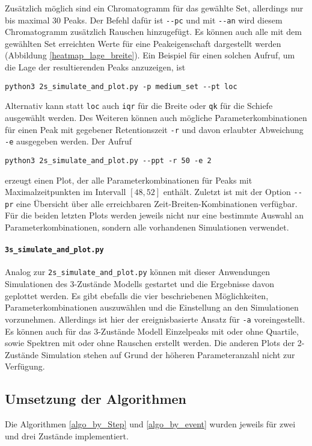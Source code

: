 Zusätzlich möglich sind ein Chromatogramm für das gewählte Set, allerdings nur bis maximal 30 Peaks. Der Befehl dafür ist \verb!--pc! und mit \verb!--an! wird diesem Chromatogramm zusätzlich Rauschen hinzugefügt.
Es können auch alle mit dem gewählten Set erreichten Werte für eine Peakeigenschaft dargestellt werden (Abbildung \ref{heatmap_lage_breite}). Ein Beispiel für einen solchen Aufruf, um die Lage der resultierenden Peaks anzuzeigen, ist
\begin{verbatim}
python3 2s_simulate_and_plot.py -p medium_set --pt loc
\end{verbatim}
Alternativ kann statt \texttt{loc} auch \texttt{iqr} für die Breite oder \texttt{qk} für die Schiefe ausgewählt werden. Des Weiteren können auch mögliche Parameterkombinationen für einen Peak mit gegebener Retentionszeit \texttt{-r} und davon erlaubter Abweichung \texttt{-e} ausgegeben werden. Der Aufruf
\begin{verbatim}
python3 2s_simulate_and_plot.py --ppt -r 50 -e 2
\end{verbatim}
erzeugt einen Plot, der alle Parameterkombinationen für Peaks mit Maximalzeitpunkten im Intervall $[48, 52]$ enthält.
Zuletzt ist mit der Option \verb!--pr! eine Übersicht über alle erreichbaren Zeit-Breiten-Kombinationen verfügbar.
Für die beiden letzten Plots werden jeweils nicht nur eine bestimmte Auswahl an Parameterkombinationen, sondern alle vorhandenen Simulationen verwendet.


\paragraph{\texttt{3s\_simulate\_and\_plot.py}}
Analog zur \texttt{2s\_simulate\_and\_plot.py} können mit dieser Anwendungen Simulationen des 3-Zustände Modells gestartet und die Ergebnisse davon geplottet werden. Es gibt ebefalls die vier beschriebenen Möglichkeiten, Parameterkombinationen auszuwählen und die Einstellung an den Simulationen vorzunehmen. Allerdings ist hier der ereignisbasierte Ansatz für \texttt{-a} voreingestellt.
Es können auch für das 3-Zustände Modell Einzelpeaks mit oder ohne Quartile, sowie Spektren mit oder ohne Rauschen erstellt werden. Die anderen Plots der 2-Zustände Simulation stehen auf Grund der höheren Parameteranzahl nicht zur Verfügung.



\subsection{Umsetzung der Algorithmen}
Die Algorithmen \ref{algo_by_Step} und \ref{algo_by_event} wurden jeweils für zwei und drei Zustände implementiert. 
 
